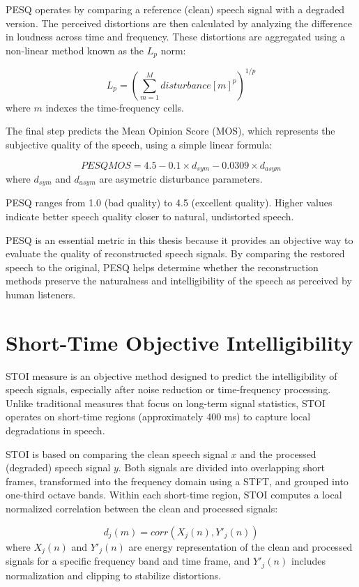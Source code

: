 PESQ operates by comparing a reference (clean) speech signal with a degraded version. The perceived distortions are then calculated by analyzing the difference in loudness across time and frequency. These distortions are aggregated using a non-linear method known as the \(L_p\) norm:

\[L_p = (\sum_{m=1}^{M}disturbance[m]^p)^{1/p}\]
where \(m\) indexes the time-frequency cells.

The final step predicts the Mean Opinion Score (MOS), which represents the subjective quality of the speech, using a simple linear formula:

\[PESQMOS = 4.5 - 0.1 \times d_{sym} - 0.0309 \times d_{asym}\]
where \(d_{sym}\) and \(d_{asym}\) are asymetric disturbance parameters.

PESQ ranges from 1.0 (bad quality) to 4.5 (excellent quality). Higher values indicate better speech quality closer to natural, undistorted speech. \cite{pesq}

PESQ is an essential metric in this thesis because it provides an objective way to evaluate the quality of reconstructed speech signals. By comparing the restored speech to the original, PESQ helps determine whether the reconstruction methods preserve the naturalness and intelligibility of the speech as perceived by human listeners.


\section{Short-Time Objective Intelligibility}
STOI measure is an objective method designed to predict the intelligibility of speech signals, especially after noise reduction or time-frequency processing. Unlike traditional measures that focus on long-term signal statistics, STOI operates on short-time regions (approximately 400 ms) to capture local degradations in speech.

STOI is based on comparing the clean speech signal \(x\) and the processed (degraded) speech signal \(y\). Both signals are divided into overlapping short frames, transformed into the frequency domain using a STFT, and grouped into one-third octave bands. Within each short-time region, STOI computes a local normalized correlation between the clean and processed signals:


\[d_j(m) = corr(X_j(n), Y'_j(n))\]
where \(X_j(n)\) and \(Y'_j(n)\) are energy representation of the clean and processed signals for a specific frequency band and time frame, and \(Y'_j(n)\) includes normalization and clipping to stabilize distortions. 

